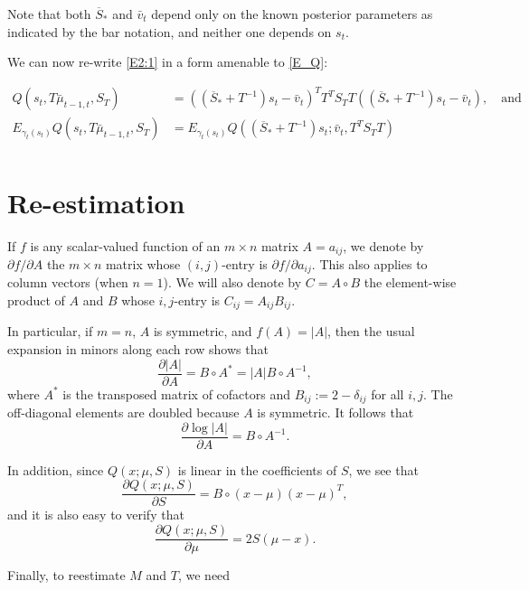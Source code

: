 \documentclass[12pt,leqno]{article}
\begin{document}
Note that both $\overline{S}_*$ and $\bar{v}_t$  depend only on the known posterior parameters as indicated
by the bar notation, and neither one depends on $s_t$.

We can now re-write \eqref{E2:1} in a form amenable to \eqref{E_Q}:

\begin{equation}\label{mu_t-1,t}
  \begin{split}
    Q(s_t,T\bar{\mu}_{t-1,t},S_T) &= ((\overline{S}_*+T^{-1})s_t - \bar{v}_t)^TT^TS_TT((\overline{S}_* + T^{-1})s_t - \bar{v}_t),\quad\text{and}\\
    E_{\gamma_t(s_t)}Q(s_t,T\bar{\mu}_{t-1,t},S_T) &= E_{\gamma_t(s_t)}Q((\overline{S}_*+T^{-1})s_t;\bar{v}_t,T^TS_TT)\\
  \end{split}
\end{equation}


\section{Re-estimation}
If $f$ is any scalar-valued function of an $m\times{n}$ matrix $A = a_{ij}$, we denote by $\partial{f}/\partial{A}$ the 
$m\times{n}$ matrix whose $(i,j)$-entry is $\partial{f}/\partial{a_{ij}}$.  This also applies to column vectors
(when $n=1$). We will also denote by $C = A\circ{B}$ the element-wise product of $A$ and $B$ whose $i,j$-entry is
$C_{ij} = A_{ij}B_{ij}$.

In particular, if $m=n$, $A$ is symmetric, and $f(A) = |A|$,  then the usual expansion 
in minors along each row shows that 
$$
\frac{\partial{|A|}}{\partial{A}} = B\circ{A}^* = |A|B\circ{A}^{-1},
$$
where $A^*$ is the transposed matrix of cofactors and $B_{ij} := 2-\delta_{ij}$ for all $i,j$.
The off-diagonal elements are doubled because $A$ is symmetric.
It follows that
$$
\frac{\partial{\log|A|}}{\partial{A}} = B\circ{A}^{-1}. 
$$

In addition, since $Q(x;\mu,S)$ is linear in the coefficients of $S$, we see that
$$
\frac{\partial{Q(x;\mu,S)}}{\partial{S}} = B\circ(x-\mu)(x-\mu)^T,
$$
and it is also easy to verify that
$$
\frac{\partial{Q(x;\mu,S)}}{\partial{\mu}} = 2S(\mu-x).
$$

Finally, to reestimate $M$ and $T$, we need
\end{document}
